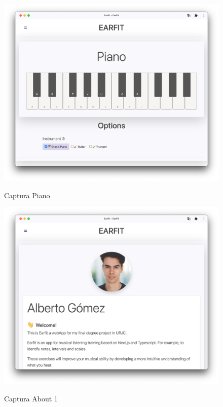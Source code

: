 \documentclass[12pt,twoside,titlepage]{report}
\begin{document}
\begin{figure}[H]
    \centering
    \includegraphics[scale=0.3]{Capturas Earfit/Tablet/Piano}
    \label{fig:TabletPiano}
    \caption{Captura Piano}
\end{figure}

\begin{figure}[H]
    \centering
    \includegraphics[scale=0.3]{Capturas Earfit/Tablet/About1}
    \label{fig:TabletAbout1}
    \caption{Captura About 1}
\end{figure}
\end{document}
